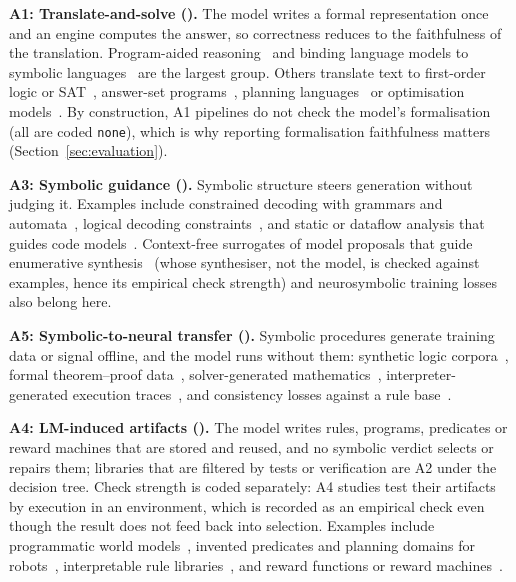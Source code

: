 \textbf{A1: Translate-and-solve ().} The model writes a formal representation once and an engine computes the answer, so correctness reduces to the faithfulness of the translation. Program-aided reasoning~\cite{gao2023pal,gou2024tora,wang2024mathcoder} and binding language models to symbolic languages~\cite{cheng2023binding} are the largest group. Others translate text to first-order logic or SAT~\cite{olausson2023linc,ye2023satlm,kesseli2025logic}, answer-set programs~\cite{alviano2025integrating,santana2024automatic}, planning languages~\cite{huang2025planning,vyas2025swarm} or optimisation models~\cite{astorga2025autoformulation,yang2025optibench}. By construction, A1 pipelines do not check the model's formalisation (all  are coded \texttt{none}), which is why reporting formalisation faithfulness matters (Section~\ref{sec:evaluation}).

\textbf{A3: Symbolic guidance ().} Symbolic structure steers generation without judging it. Examples include constrained decoding with grammars and automata~\cite{scholak2021picard,wang2023grammar,beurerkellner2024guiding,banerjee2025crane}, logical decoding constraints~\cite{lu2021neurologic,lu2022neurologic,zhang2023tractable}, and static or dataflow analysis that guides code models~\cite{mukherjee2021neural,wei2023typet5,li2025dataflow}. Context-free surrogates of model proposals that guide enumerative synthesis~\cite{barke2024hysynth} (whose synthesiser, not the model, is checked against examples, hence its empirical check strength) and neurosymbolic training losses~\cite{ahmed2023pseudo} also belong here.

\textbf{A5: Symbolic-to-neural transfer ().} Symbolic procedures generate training data or signal offline, and the model runs without them: synthetic logic corpora~\cite{clark2020transformers,morishita2023learning,morishita2024enhancing}, formal theorem--proof data~\cite{huang2024mustard,ying2024lean,wu2025alchemy}, solver-generated mathematics~\cite{li2024neuro}, interpreter-generated execution traces~\cite{li2025codeio,wang2026stepcodereasoner}, and consistency losses against a rule base~\cite{calanzone2025logically}.

\textbf{A4: LM-induced artifacts ().} The model writes rules, programs, predicates or reward machines that are stored and reused, and no symbolic verdict selects or repairs them; libraries that are filtered by tests or verification are A2 under the decision tree. Check strength is coded separately:  A4 studies test their artifacts by execution in an environment, which is recorded as an empirical check even though the result does not feed back into selection. Examples include programmatic world models~\cite{tang2024worldcoder,piriyakulkij2025poe}, invented predicates and planning domains for robots~\cite{liang2025visualpredicator,liang2026exopredicator,ye2025unidomain}, interpretable rule libraries~\cite{wang2025large,zhang2025ruag}, and reward functions or reward machines~\cite{xie2024text2reward,castanyer2026arm}.

